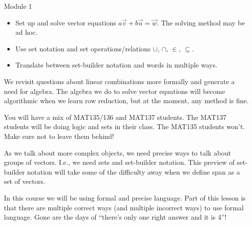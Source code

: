 \begin{lesson}

	Module 1

	\begin{itemize}
		\item Set up and solve vector equations $a\vec v+b\vec u=\vec w$. The solving
			method may be ad hoc.
		\item Use set notation and set operations/relations $\cup$, $\cap$, $\in$, $\subseteq$.
		\item Translate between set-builder notation and words in multiple ways.
	\end{itemize}

	We revisit questions about linear combinations more formally and generate a need for
	algebra. The algebra we do to solve vector equations will become algorithmic when
	we learn row reduction, but at the moment, any method is fine.

	\begin{annotation}
		\begin{notes}
			You will have a mix of MAT135/136 and MAT137 students.
			The MAT137 students will be doing logic and sets in their
			class. The MAT135 students won't. Make sure not to leave them
			behind!
		\end{notes}
	\end{annotation}
	As we talk about more complex objects, we need precise ways to talk about
	groups of vectors. I.e., we need sets and set-builder notation. This preview of set-builder
	notation will take some of the difficulty away when we define span as a set of vectors.

	In this course we will be using formal and precise language. Part of this lesson
	is that there are multiple correct ways (and multiple incorrect ways) to use formal
	language. Gone are the days of ``there's only one right answer and it is 4''!

\end{lesson}

